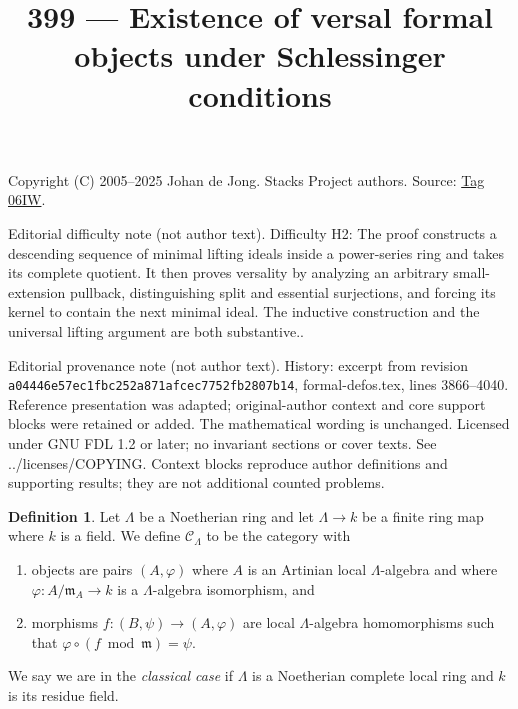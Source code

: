 \documentclass{amsart}
\theoremstyle{plain}
\theoremstyle{definition}
\newtheorem{definition}[subsection]{Definition}
\theoremstyle{remark}
\numberwithin{equation}{subsection}
\begin{document}
\title[Stacks Project, Tag 06IW]{399 --- Existence of versal formal objects under Schlessinger conditions}
\maketitle
\noindent Copyright (C) 2005--2025 Johan de Jong. Stacks Project authors. Source: \href{https://stacks.math.columbia.edu/tag/06IW}{Tag 06IW}.

\noindent Editorial difficulty note (not author text). Difficulty H2: The proof constructs a descending sequence of minimal lifting ideals inside a power-series ring and takes its complete quotient. It then proves versality by analyzing an arbitrary small-extension pullback, distinguishing split and essential surjections, and forcing its kernel to contain the next minimal ideal. The inductive construction and the universal lifting argument are both substantive..

\noindent Editorial provenance note (not author text). History: excerpt from revision \texttt{a0444\allowbreak 6e57e\allowbreak c1fbc\allowbreak 252a8\allowbreak 71afc\allowbreak ec775\allowbreak 2fb28\allowbreak 07b14}, formal-defos.tex, lines 3866--4040. Reference presentation was adapted; original-author context and core support blocks were retained or added. The mathematical wording is unchanged. Licensed under GNU FDL 1.2 or later; no invariant sections or cover texts. See ../licenses/COPYING. Context blocks reproduce author definitions and supporting results; they are not additional counted problems.

\begin{definition}
\label{definition-CLambda}
Let $\Lambda$ be a Noetherian ring and let $\Lambda \to k$ be a finite
ring map where $k$ is a field. We define {\it $\mathcal{C}_\Lambda$} to be
the category with
\begin{enumerate}
\item objects are pairs $(A, \varphi)$ where $A$ is an Artinian local
$\Lambda$-algebra and where $\varphi : A/\mathfrak m_A \to k$ is a
$\Lambda$-algebra isomorphism, and
\item morphisms $f : (B, \psi) \to (A, \varphi)$ are local $\Lambda$-algebra
homomorphisms such that $\varphi \circ (f \bmod \mathfrak m) = \psi$.
\end{enumerate}
We say we are in the {\it classical case} if $\Lambda$ is a Noetherian
complete local ring and $k$ is its residue field.
\end{definition}
\end{document}
